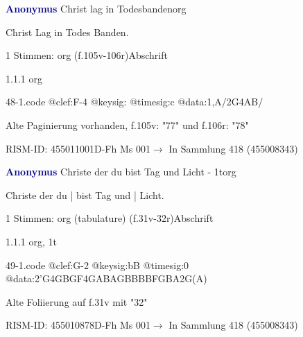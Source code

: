 \documentclass[twocolumn]{book}
\begin{document}
\par \vspace{7pt} \textcolor{darkblue}{\textbf{Anonymus  }}\hfillplus{\textbf{[48]}}\newline Christ lag in Todesbanden\newline org
\par \begin{itshape}[f.105v, heading:] Christ Lag in Todes Banden.\end{itshape} 
\par \textcolor{darkblue}{}  1 Stimmen: org  (f.105v-106r)\newline Abschrift
\par 1.1.1  org  
\begin{filecontents*}{48-1.code}
@clef:F-4
@keysig:
@timesig:c
@data:1,A/2G4AB/%
\end{filecontents*}
\newline
%
\par Alte Paginierung vorhanden, f.105v: "77" und f.106r: "78"
\par RISM-ID: 455011001\newline D-Fh  Ms 001\newline $\rightarrow$ In Sammlung 418 (455008343)
      
\par \vspace{7pt} \textcolor{darkblue}{\textbf{Anonymus  }}\hfillplus{\textbf{[49]}}\newline Christe der du bist Tag und Licht - 1t\newline org
\par \begin{itshape}[f.31v, at left:] Christe der du | bist Tag und | Licht.\end{itshape} 
\par \textcolor{darkblue}{}  1 Stimmen: org (tabulature)  (f.31v-32r)\newline Abschrift
\par 1.1.1  org, 1t  
\begin{filecontents*}{49-1.code}
@clef:G-2
@keysig:bB
@timesig:0
@data:2'G4GBGF4GABAGBBBBFGBA2G(A)
\end{filecontents*}
\newline
%
\par Alte Foliierung auf f.31v mit "32"
\par RISM-ID: 455010878\newline D-Fh  Ms 001\newline $\rightarrow$ In Sammlung 418 (455008343)
      
\end{document}
